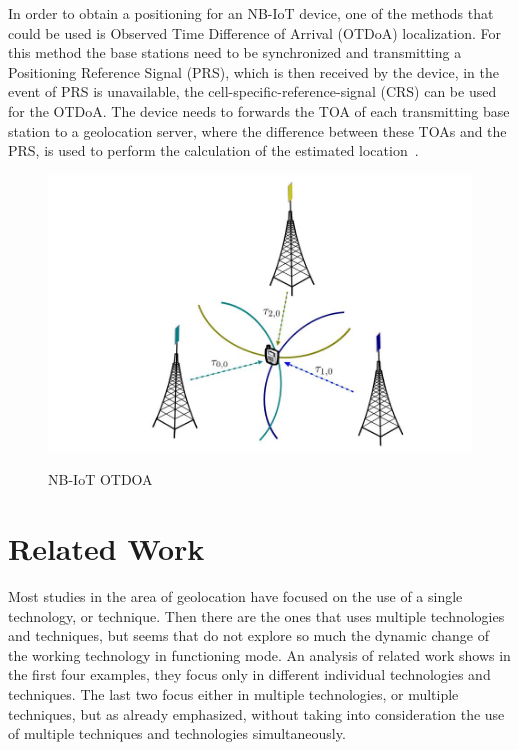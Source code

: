\newline In order to obtain a positioning for an NB-IoT device, one of the methods that could be used is  Observed Time Difference of Arrival (OTDoA) localization. For this method the base stations need to be synchronized and transmitting  a Positioning Reference Signal (PRS), which is then received by the device, in the event of PRS is unavailable, the cell-specific-reference-signal (CRS) can be used for the OTDoA. The  device needs to forwards the TOA of each  transmitting base station to a geolocation server, where the difference between these TOAs and the PRS, is used to perform the calculation of the estimated location~\cite{Hu2017}.\newline

\begin{figure}[htbp]
  \centering
    {\includegraphics[width=0.65\linewidth]{Chapters/Figures/NBOTDOA.JPG}}%
  \caption{NB-IoT OTDOA~\cite{Hu2017}}
  \label{fig:NBOTDOA}
\end{figure}




\newpage
\section{Related Work} %
\label{sec:related_work}


Most studies in the area of geolocation have focused on the use of a single technology, or technique. Then there are the ones that uses multiple technologies and techniques, but seems that do not explore so much the dynamic change of the working technology in functioning mode.
An analysis of related work shows in the first four examples, they focus only in different individual technologies and techniques. The last two focus either in multiple technologies, or multiple techniques, but as already emphasized, without taking into consideration the use of multiple techniques and technologies simultaneously.

